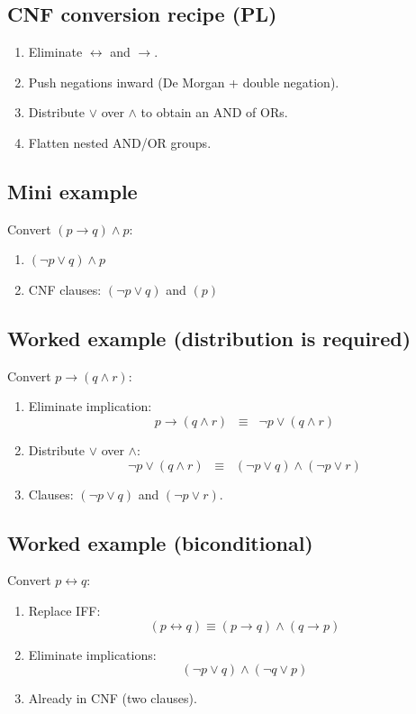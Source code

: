 \documentclass[11pt]{article}
\begin{document}
\subsection{CNF conversion recipe (PL)}
\begin{enumerate}[leftmargin=*]
  \item Eliminate $\leftrightarrow$ and $\rightarrow$.
  \item Push negations inward (De Morgan + double negation).
  \item Distribute $\lor$ over $\land$ to obtain an AND of ORs.
  \item Flatten nested AND/OR groups.
\end{enumerate}

\subsection{Mini example}
Convert $(p \rightarrow q) \land p$:
\begin{enumerate}[leftmargin=*]
  \item $(\lnot p \lor q) \land p$
  \item CNF clauses: $(\lnot p \lor q)$ and $(p)$
\end{enumerate}

\subsection{Worked example (distribution is required)}
Convert $p \rightarrow (q \land r)$:
\begin{enumerate}[leftmargin=*]
  \item Eliminate implication:
  \[
    p \rightarrow (q \land r)\;\;\equiv\;\; \lnot p \lor (q \land r)
  \]
  \item Distribute $\lor$ over $\land$:
  \[
    \lnot p \lor (q \land r)\;\;\equiv\;\;(\lnot p \lor q) \land (\lnot p \lor r)
  \]
  \item Clauses: $(\lnot p \lor q)$ and $(\lnot p \lor r)$.
\end{enumerate}

\subsection{Worked example (biconditional)}
Convert $p \leftrightarrow q$:
\begin{enumerate}[leftmargin=*]
  \item Replace IFF:
  \[
    (p \leftrightarrow q) \equiv (p \rightarrow q) \land (q \rightarrow p)
  \]
  \item Eliminate implications:
  \[
    (\lnot p \lor q) \land (\lnot q \lor p)
  \]
  \item Already in CNF (two clauses).
\end{enumerate}
\end{document}

